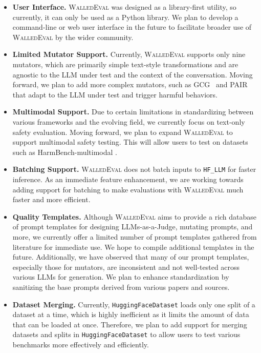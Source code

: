\documentclass[11pt]{article}
\newcommand{\tool}{\textsc{WalledEval}}
\newcommand{\llmcls}{{\color{purple} \texttt{HF\_LLM}}}
\newcommand{\datacls}{{\color{purple} \texttt{HuggingFaceDataset}}}
\begin{document}
\begin{itemize}[left=1pt, labelsep=-1pt, label={\textbullet\hspace{0.1cm}}]
    \item \textbf{User Interface.} \tool{} was designed as a library-first utility, so currently, it can only be used as a Python library. We plan to develop a command-line or web user interface in the future to facilitate broader use of \tool{} by the wider community.

    \item \textbf{Limited Mutator Support.} Currently, \tool{} supports only nine mutators, which are primarily simple text-style transformations and are agnostic to the LLM under test and the context of the conversation. Moving forward, we plan to add more complex mutators, such as GCG~\cite{zou2023universal} and PAIR~\cite{chao2023jailbreaking} that adapt to the LLM under test and trigger harmful behaviors.

    \item \textbf{Multimodal Support.} Due to certain limitations in standardizing between various frameworks and the evolving field, we currently focus on text-only safety evaluation. Moving forward, we plan to expand \tool{} to support multimodal safety testing. This will allow users to test on datasets such as HarmBench-multimodal \cite{mazeika2024harmbench}.


    \item \textbf{Batching Support.} \tool{} does not batch inputs to \llmcls{} for faster inference. As an immediate feature enhancement, we are working towards adding support for batching to make evaluations with \tool{} much faster and more efficient.

    \item \textbf{Quality Templates.} Although \tool{} aims to provide a rich database of prompt templates for designing LLMs-as-a-Judge, mutating prompts, and more, we currently offer a limited number of prompt templates gathered from literature for immediate use. We hope to compile additional templates in the future. Additionally, we have observed that many of our prompt templates, especially those for mutators, are inconsistent and not well-tested across various LLMs for generation. We plan to enhance standardization by sanitizing the base prompts derived from various papers and sources.

    \item \textbf{Dataset Merging.} Currently, \datacls{} loads only one split of a dataset at a time, which is highly inefficient as it limits the amount of data that can be loaded at once. Therefore, we plan to add support for merging datasets and splits in \datacls{} to allow users to test various benchmarks more effectively and efficiently.
\end{itemize}
\end{document}
